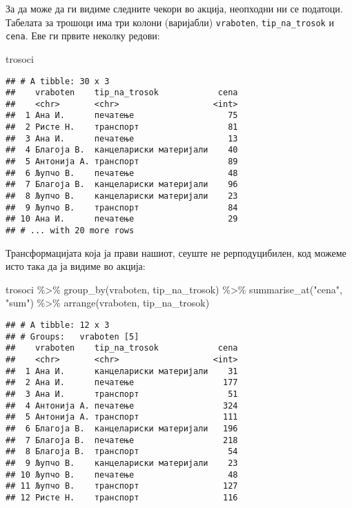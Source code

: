 \documentclass[
]{book}
\newenvironment{Shaded}{\begin{snugshade}}{\end{snugshade}}
\newcommand{\FunctionTok}[1]{\textcolor[rgb]{0.00,0.00,0.00}{#1}}
\newcommand{\NormalTok}[1]{#1}
\newcommand{\SpecialCharTok}[1]{\textcolor[rgb]{0.00,0.00,0.00}{#1}}
\newcommand{\StringTok}[1]{\textcolor[rgb]{0.31,0.60,0.02}{#1}}
\begin{document}
За да може да ги видиме следните чекори во акција, неопходни ни се податоци. Табелата за трошоци има три колони (варијабли) \texttt{vraboten}, \texttt{tip\_na\_trosok} и \texttt{cena}. Еве ги првите неколку редови:

\begin{Shaded}
\begin{Highlighting}[]
\NormalTok{trosoci}
\end{Highlighting}
\end{Shaded}

\begin{verbatim}
## # A tibble: 30 x 3
##    vraboten    tip_na_trosok            cena
##    <chr>       <chr>                   <int>
##  1 Ана И.      печатење                   75
##  2 Ристе Н.    транспорт                  81
##  3 Ана И.      печатење                   13
##  4 Благоја В.  канцелариски материјали    40
##  5 Антонија А. транспорт                  89
##  6 Љупчо В.    печатење                   48
##  7 Благоја В.  канцелариски материјали    96
##  8 Љупчо В.    канцелариски материјали    23
##  9 Љупчо В.    транспорт                  84
## 10 Ана И.      печатење                   29
## # ... with 20 more rows
\end{verbatim}

Трансформацијата која ја прави нашиот, сеуште не рерподуцибилен, код можеме исто така да ја видиме во акција:

\begin{Shaded}
\begin{Highlighting}[]
\NormalTok{trosoci }\SpecialCharTok{\%\textgreater{}\%} 
  \FunctionTok{group\_by}\NormalTok{(vraboten, tip\_na\_trosok) }\SpecialCharTok{\%\textgreater{}\%} 
  \FunctionTok{summarise\_at}\NormalTok{(}\StringTok{"cena"}\NormalTok{, }\StringTok{"sum"}\NormalTok{) }\SpecialCharTok{\%\textgreater{}\%} 
  \FunctionTok{arrange}\NormalTok{(vraboten, tip\_na\_trosok)}
\end{Highlighting}
\end{Shaded}

\begin{verbatim}
## # A tibble: 12 x 3
## # Groups:   vraboten [5]
##    vraboten    tip_na_trosok            cena
##    <chr>       <chr>                   <int>
##  1 Ана И.      канцелариски материјали    31
##  2 Ана И.      печатење                  177
##  3 Ана И.      транспорт                  51
##  4 Антонија А. печатење                  324
##  5 Антонија А. транспорт                 111
##  6 Благоја В.  канцелариски материјали   196
##  7 Благоја В.  печатење                  218
##  8 Благоја В.  транспорт                  54
##  9 Љупчо В.    канцелариски материјали    23
## 10 Љупчо В.    печатење                   48
## 11 Љупчо В.    транспорт                 127
## 12 Ристе Н.    транспорт                 116
\end{verbatim}
\end{document}
